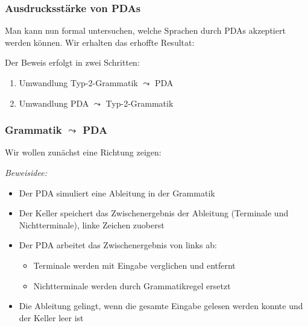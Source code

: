 \documentclass[aspectratio=1610,onlymath]{beamer}
\begin{document}
\begin{frame}\frametitle{Ausdrucksstärke von PDAs}

Man kann nun formal untersuchen, welche Sprachen durch PDAs akzeptiert werden können.
Wir erhalten das erhoffte Resultat:\medskip

\pause\bigskip

Der Beweis erfolgt in zwei Schritten:
\begin{enumerate}[(1)]
\item Umwandlung Typ-2-Grammatik $\leadsto$ PDA
\item Umwandlung PDA $\leadsto$ Typ-2-Grammatik
\end{enumerate}

\end{frame}

\begin{frame}[t]\frametitle{Grammatik $\leadsto$ PDA}

Wir wollen zunächst eine Richtung zeigen:

\pause\bigskip

\emph{Beweisidee:}
\begin{itemize}
\item Der PDA simuliert eine Ableitung in der Grammatik
\item Der Keller speichert das Zwischenergebnis der Ableitung (Terminale und Nichtterminale), linke Zeichen zuoberst
\item Der PDA arbeitet das Zwischenergebnis von links ab:
\begin{itemize}
\item Terminale werden mit Eingabe verglichen und entfernt
\item Nichtterminale werden durch Grammatikregel ersetzt
\end{itemize}
\item Die Ableitung gelingt, wenn die gesamte Eingabe gelesen werden konnte und der Keller leer ist
\end{itemize}

\end{frame}
\end{document}
